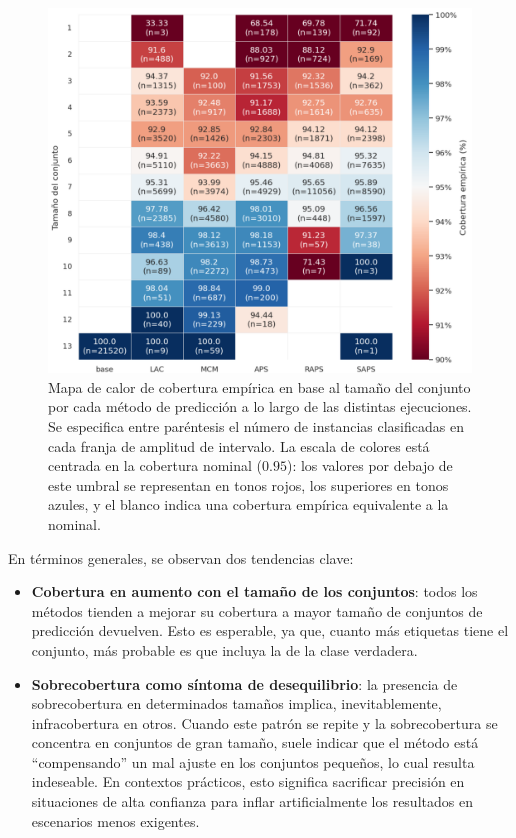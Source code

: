 \begin{figure}[h]
    \centering
    \includegraphics[width=\textwidth]{capitulos/cap_05/imagenes/AGC_coverage_by_PSS.png}
    \caption[
        Problema de clasificación de edad: 
        Mapa de calor de cobertura empírica en base al tamaño del conjunto por cada método de predicción a lo largo de las distintas ejecuciones.
    ]{
        Mapa de calor de cobertura empírica en base al tamaño del conjunto por cada método de predicción a lo largo de las distintas ejecuciones.
        Se especifica entre paréntesis el número de instancias clasificadas en cada franja de amplitud de intervalo.
        La escala de colores está centrada en la cobertura nominal ($0.95$): los valores por debajo de este umbral se representan en tonos rojos, los superiores en tonos azules, y el blanco indica una cobertura empírica equivalente a la nominal.
    }
    \label{fig:AGC_coverage_by_PSS}
\end{figure}

En términos generales, se observan dos tendencias clave:

\begin{itemize}
    
    \item \textbf{Cobertura en aumento con el tamaño de los conjuntos}: todos los métodos tienden a mejorar su cobertura a mayor tamaño de conjuntos de predicción devuelven. Esto es esperable, ya que, cuanto más etiquetas tiene el conjunto, más probable es que incluya la de la clase verdadera.
    
    \item \textbf{Sobrecobertura como síntoma de desequilibrio}: la presencia de sobrecobertura en determinados tamaños implica, inevitablemente, infracobertura en otros. Cuando este patrón se repite y la sobrecobertura se concentra en conjuntos de gran tamaño, suele indicar que el método está ``compensando'' un mal ajuste en los conjuntos pequeños, lo cual resulta indeseable. En contextos prácticos, esto significa sacrificar precisión en situaciones de alta confianza para inflar artificialmente los resultados en escenarios menos exigentes.
    
\end{itemize}

